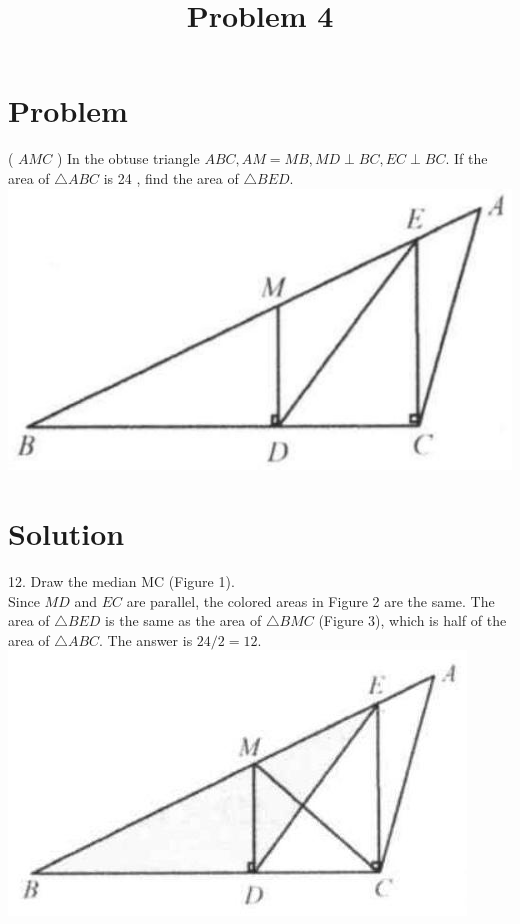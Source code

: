 \documentclass{article}
\title{Problem 4}
\date{}
\begin{document}
\maketitle

\section*{Problem}
( \(A M C\) ) In the obtuse triangle \(A B C, A M=M B, M D \perp B C, E C \perp B C\). If the area of \(\triangle A B C\) is 24 , find the area of \(\triangle B E D\).\\
\centering
\includegraphics[width=\textwidth]{images/015.jpg}

\section*{Solution}
12.
Draw the median MC (Figure 1).\\
Since \(M D\) and \(E C\) are parallel, the colored areas in Figure 2 are the same. The area of \(\triangle B E D\) is the same as the area of \(\triangle B M C\) (Figure 3), which is half of the area of \(\triangle A B C\). The answer is \(24 / 2=12\).\\
\centering
\includegraphics[width=\textwidth]{images/018(2).jpg}
\end{document}
